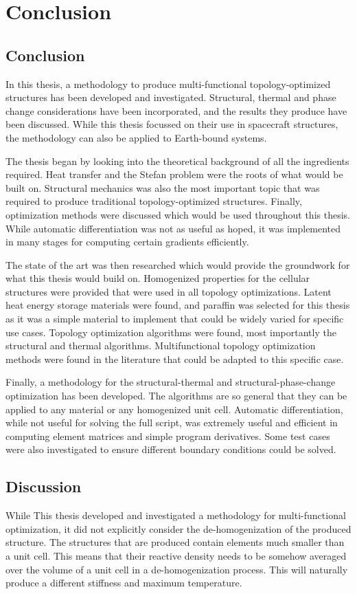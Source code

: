 \chapter{Conclusion}
\label{chap:conclusion}
\section{Conclusion}
In this thesis, a methodology to produce multi-functional topology-optimized structures has been developed and investigated. Structural, thermal and phase change considerations have been incorporated, and the results they produce have been discussed. While this thesis focussed on their use in spacecraft structures, the methodology can also be applied to Earth-bound systems.

The thesis began by looking into the theoretical background of all the ingredients required. Heat transfer and the Stefan problem were the roots of what would be built on. Structural mechanics was also the most important topic that was required to produce traditional topology-optimized structures. Finally, optimization methods were discussed which would be used throughout this thesis. While automatic differentiation was not as useful as hoped, it was implemented in many stages for computing certain gradients efficiently.

The state of the art was then researched which would provide the groundwork for what this thesis would build on. Homogenized properties for the cellular structures were provided that were used in all topology optimizations. Latent heat energy storage materials were found, and paraffin was selected for this thesis as it was a simple material to implement that could be widely varied for specific use cases. Topology optimization algorithms were found, most importantly the structural and thermal algorithms. Multifunctional topology optimization methods were found in the literature that could be adapted to this specific case.

Finally, a methodology for the structural-thermal and structural-phase-change optimization has been developed. The algorithms are so general that they can be applied to any material or any homogenized unit cell. Automatic differentiation, while not useful for solving the full script, was extremely useful and efficient in computing element matrices and simple program derivatives. Some test cases were also investigated to ensure different boundary conditions could be solved.

\section{Discussion}
While This thesis developed and investigated a methodology for multi-functional optimization, it did not explicitly consider the de-homogenization of the produced structure. The structures that are produced contain elements much smaller than a unit cell. This means that their reactive density needs to be somehow averaged over the volume of a unit cell in a de-homogenization process. This will naturally produce a different stiffness and maximum temperature.

